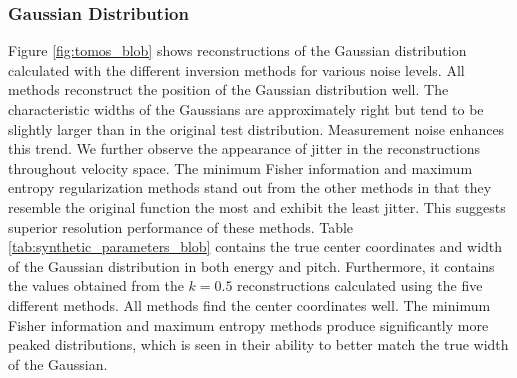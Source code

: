 \subsubsection{Gaussian Distribution}
Figure \ref{fig:tomos_blob} shows reconstructions of the Gaussian distribution calculated with the different inversion methods for various noise levels. 
All methods reconstruct the position of the Gaussian distribution well. The characteristic widths of the Gaussians are approximately right but tend to be slightly larger than in the original test distribution. Measurement noise enhances this trend. We further observe the appearance of jitter in the reconstructions throughout velocity space. 
The minimum Fisher information and maximum entropy regularization methods stand out from the other methods in that they resemble the original function the most and exhibit the least jitter. This suggests superior resolution performance of these methods. Table \ref{tab:synthetic_parameters_blob} contains the true center coordinates and width of the Gaussian distribution in both energy and pitch. Furthermore, it contains the values obtained from the $k=0.5$ reconstructions calculated using the five different methods. All methods find the center coordinates well. The minimum Fisher information and maximum entropy methods produce significantly more peaked distributions, which is seen in their ability to better match the true width of the Gaussian. 
\begin{table}[h!]
    \caption{\label{tab:synthetic_parameters_blob} Parameters of the Gaussian test distribution. Parameters are found by fitting the reconstructed distributions to the analytic form of the true distribution.}
\end{table}

